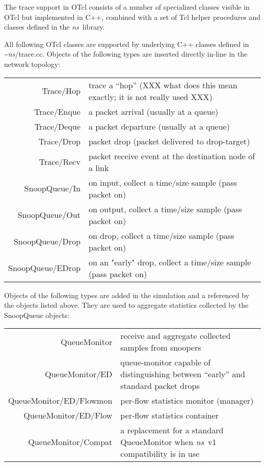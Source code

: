 The trace support in OTcl consists of a number of specialized
classes visible in OTcl but implemented in C++, combined
with a set of Tcl helper procedures and classes defined in the \emph{ns}\ library.

All following OTcl classes are supported by underlying C++
classes defined in \textasciitilde\emph{ns}/{trace.cc}.
Objects of the following types are inserted directly in-line in the
network topology:

\begin{tabularx}{\linewidth}{rX}
Trace/Hop & trace a ``hop'' (XXX what does this mean exactly; it is not really used XXX) \\
Trace/Enque & a packet arrival (usually at a queue) \\
Trace/Deque & a packet departure (usually at a queue) \\
Trace/Drop & packet drop (packet delivered to drop-target) \\
Trace/Recv & packet receive event at the destination node of a link \\
SnoopQueue/In & on input, collect a time/size sample (pass packet on) \\
SnoopQueue/Out & on output, collect a time/size sample (pass packet on) \\
SnoopQueue/Drop & on drop, collect a time/size sample (pass packet on) \\
SnoopQueue/EDrop & on an "early" drop, collect a time/size sample (pass packet on) \\
\end{tabularx}

Objects of the following types are added in the simulation and a referenced
by the objects listed above.  They are used to aggregate statistics collected
by the SnoopQueue objects:

\begin{tabularx}{\linewidth}{rX}
QueueMonitor & receive and aggregate collected samples from snoopers \\
QueueMonitor/ED & queue-monitor capable of distinguishing between ``early'' and standard packet drops \\
QueueMonitor/ED/Flowmon & per-flow statistics monitor (manager) \\
QueueMonitor/ED/Flow & per-flow statistics container \\
QueueMonitor/Compat & a replacement for a standard QueueMonitor when \emph{ns}~v1 compatibility is in use \\
\end{tabularx}

